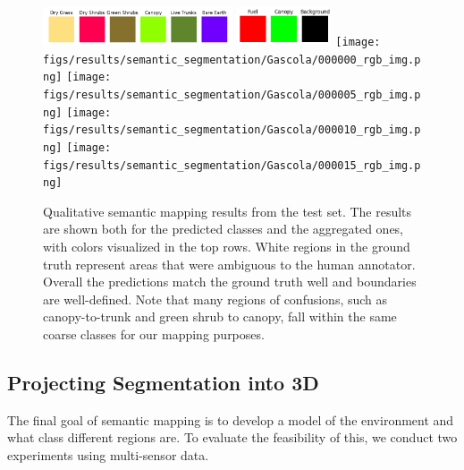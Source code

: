 \begin{figure}[h!]
   \centering
   \includegraphics[width=0.5\textwidth]{figs/results/semantic_segmentation/Gascola/safeforest_all_classes_flat.png}
   \includegraphics[width=0.25\textwidth]{figs/results/semantic_segmentation/Gascola/safeforest_classmap_compressed_flat.png}
   \texttt{[image: figs/results/semantic\_segmentation/Gascola/000000\_rgb\_img.png]}
   \vspace{0pt}
   \texttt{[image: figs/results/semantic\_segmentation/Gascola/000005\_rgb\_img.png]}
   \vspace{0pt}
   \texttt{[image: figs/results/semantic\_segmentation/Gascola/000010\_rgb\_img.png]}
   \vspace{0pt}
   \texttt{[image: figs/results/semantic\_segmentation/Gascola/000015\_rgb\_img.png]}
   \vspace{0pt}
   \caption{
   Qualitative semantic mapping results from the test set. The results are shown both for the predicted classes and the aggregated ones, with colors visualized in the top rows.
   White regions in the ground truth represent areas that were ambiguous to the human annotator. Overall the predictions match the ground truth well and boundaries are well-defined. Note that many regions of confusions, such as canopy-to-trunk and green shrub to canopy, fall within the same coarse classes for our mapping purposes.
   }
   \label{fig:results:semantic_gascola_qualitative}                %
\end{figure}

\subsection{Projecting Segmentation into 3D}
The final goal of semantic mapping is to develop a model of the environment and what class different regions are. To evaluate the feasibility of this, we conduct two experiments using multi-sensor data.

